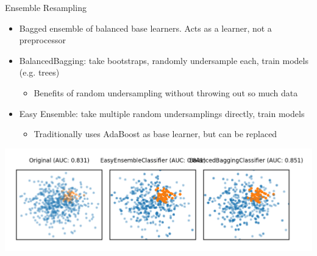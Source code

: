\begin{frame}{Ensemble Resampling}
\begin{itemize}
    \item Bagged ensemble of balanced base learners. Acts as a learner, not a preprocessor
    \item BalancedBagging: take bootstraps, randomly undersample each, train models (e.g. trees)
    \begin{itemize}
        \item Benefits of random undersampling without throwing out so much data
    \end{itemize}
    \item Easy Ensemble: take multiple random undersamplings directly, train models
    \begin{itemize}
        \item Traditionally uses AdaBoost as base learner, but can be replaced
    \end{itemize}
\end{itemize}

\begin{center}
    \includegraphics[width=0.9\linewidth]{images/pre-processing/ensemble-resampling}
\end{center}
\end{frame}


